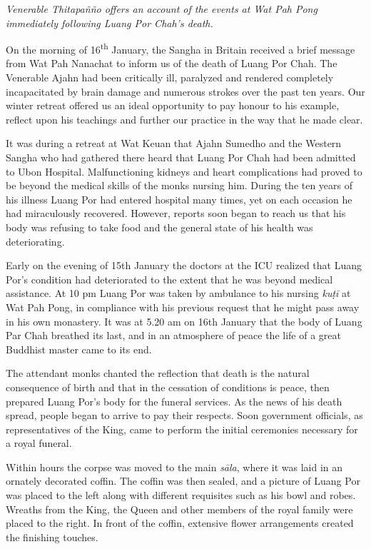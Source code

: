 
\emph{Venerable Thitapañño offers an account of the events at Wat Pah
Pong immediately following Luang Por Chah's death.}

On the morning of 16\textsuperscript{th} January, the Sangha in Britain received a brief
message from Wat Pah Nanachat to inform us of the death of Luang Por
Chah. The Venerable Ajahn had been critically ill, paralyzed and
rendered completely incapacitated by brain damage and numerous strokes
over the past ten years. Our winter retreat offered us an ideal
opportunity to pay honour to his example, reflect upon his teachings and
further our practice in the way that he made clear. 

It was during a retreat at Wat Keuan that Ajahn Sumedho and the
Western Sangha who had gathered there heard that Luang Por Chah had been
admitted to Ubon Hospital. Malfunctioning kidneys and heart
complications had proved to be beyond the medical skills of the monks
nursing him. During the ten years of his illness Luang Por had entered
hospital many times, yet on each occasion he had miraculously recovered. 
However, reports soon began to reach us that his body was refusing to
take food and the general state of his health was deteriorating. 

Early on the evening of 15th January the doctors at the ICU realized
that Luang Por's condition had deteriorated to the extent that he was
beyond medical assistance. At 10 pm Luang Por was taken by ambulance to
his nursing \emph{kuṭī} at Wat Pah Pong, in compliance with his previous
request that he might pass away in his own monastery. It was at 5.20 am
on 16th January that the body of Luang Par Chah breathed its last, and
in an atmosphere of peace the life of a great Buddhist master came to
its end. 

The attendant monks chanted the reflection that death is the natural
consequence of birth and that in the cessation of conditions is peace, 
then prepared Luang Por's body for the funeral services. As the news of
his death spread, people began to arrive to pay their respects. Soon
government officials, as representatives of the King, came to perform
the initial ceremonies necessary for a royal funeral. 

Within hours the corpse was moved to the main \emph{sāla}, where it was
laid in an ornately decorated coffin. The coffin was then sealed, and a
picture of Luang Por was placed to the left along with different
requisites such as his bowl and robes. Wreaths from the King, the Queen
and other members of the royal family were placed to the right. In front
of the coffin, extensive flower arrangements created the finishing
touches. 

